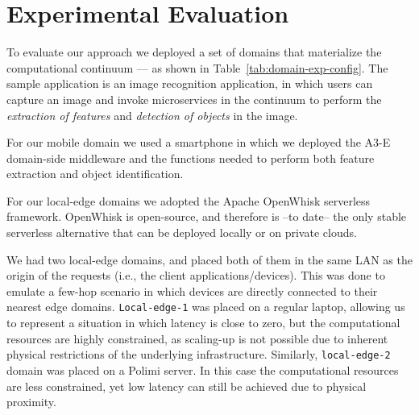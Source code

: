 \section{Experimental Evaluation}\label{sec:evaluation}



To evaluate our approach we deployed a set of domains that materialize the computational continuum --- as shown in Table~\ref{tab:domain-exp-config}. The sample application is an image recognition application, in which users can capture an image and invoke microservices in the continuum to perform the \textit{extraction of features} and \textit{detection of objects} in the image.

For our mobile domain we used a smartphone in which we deployed the A3-E domain-side middleware and the functions needed to perform both feature extraction and object identification. 

For our local-edge domains we adopted the Apache OpenWhisk serverless framework. OpenWhisk is open-source, and therefore is --to date-- the only stable serverless alternative that can be deployed locally or on private clouds. 


We had two local-edge domains, and placed both of them in the same LAN as the origin of the requests (i.e., the client applications/devices). This was done to emulate a few-hop scenario in which devices are directly connected to their nearest edge domains. \texttt{Local-edge-1} was placed on a regular laptop, allowing us to represent a situation in which latency is close to zero, but the computational resources are highly constrained, as scaling-up is not possible due to inherent physical restrictions of the underlying infrastructure. Similarly, \texttt{local-edge-2} domain was placed on a Polimi server. In this case the computational resources are less constrained, yet low latency can still be achieved due to physical proximity.

